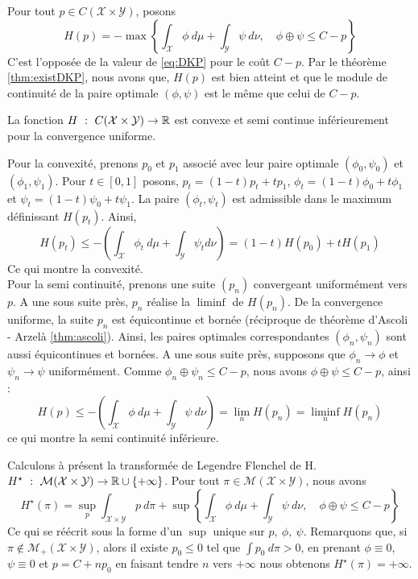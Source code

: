 \documentclass[a4paper,12pt]{article}
\begin{document}
\begin{preuve}
Pour tout $p\in C(\mathcal{X}\times\mathcal{Y})$, posons 
$$
H(p) = -\max\left\{\int_{\mathcal{X}} \phi\ d\mu +\int_{\mathcal{Y}} \psi\ d\nu, \quad \phi\oplus\psi\leq C-p\right\}
$$
C'est l'opposée de la valeur de \eqref{eq:DKP} pour le coût $C-p$. Par le théorème \ref{thm:existDKP}, nous avons que, $H(p)$ est bien atteint et que le module de continuité de la paire optimale $(\phi,\psi)$ est le même que celui de $C-p$. 
\begin{lemme}
La fonction $H\ :\ C(\mathcal{X}\times\mathcal{Y})\rightarrow\RR$ est convexe et semi continue inférieurement pour la convergence uniforme.
\end{lemme}
\begin{preuve}
Pour la convexité, prenons $p_0$ et $p_1$ associé avec leur paire optimale $(\phi_0,\psi_0)$ et $(\phi_1,\psi_1)$. Pour $t\in [0,1]$ posons, $p_t=(1-t)p_t+tp_1$, $\phi_t=(1-t)\phi_0 + t\phi_1$ et $\psi_t=(1-t)\psi_0+t\psi_1$. La paire $(\phi_t,\psi_t)$ est admissible dans le maximum définissant $H(p_t)$. Ainsi, 
$$
H(p_t)\leq-\left(\int_{\mathcal{X}}\phi_t\ d\mu+\int_{\mathcal{Y}}\psi_t d\nu\right) = (1-t)H(p_0)+tH(p_1)
$$
Ce qui montre la convexité.\\
Pour la semi continuité, prenons une suite $(p_n)$ convergeant uniformément vers $p$. A une sous suite près, $p_n$ réalise la $\liminf$ de $H(p_n)$. De la convergence uniforme, la suite $p_n$ est équicontinue et bornée (réciproque de théorème d'Ascoli - Arzelà \eqref{thm:ascoli}). Ainsi, les paires optimales correspondantes $(\phi_n,\psi_n)$ sont aussi équicontinues et bornées. A une sous suite près, supposons que $\phi_n\rightarrow\phi$ et $\psi_n\rightarrow\psi$ uniformément. Comme $\phi_n\oplus\psi_n\leq C-p$, nous avons $\phi\oplus\psi\leq C-p$, ainsi :
$$
H(p) \leq - \left(\int_{\mathcal{X}}\phi\ d\mu+\int_{\mathcal{Y}}\psi\ d\nu\right) = \lim_n H(p_n)=\liminf_n H(p_n)
$$
ce qui montre la semi continuité inférieure.
\end{preuve}
Calculons à présent la transformée de Legendre Flenchel de H.\\
$H^{\star}\ :\ \mathcal{M}(\mathcal{X}\times\mathcal{Y})\rightarrow\RR\cup\{+\infty\}$. Pour tout $\pi\in\mathcal{M}(\mathcal{X}\times\mathcal{Y})$, nous avons 
$$
H^{\star}(\pi)= \sup_p \int_{\mathcal{X}\times\mathcal{Y}} p\ d\pi + \sup \left\{ \int_{\mathcal{X}}\phi\ d\mu + \int_{\mathcal{Y}}\psi\ d\nu, \quad \phi\oplus\psi\leq C- p \right\}
$$
Ce qui se réécrit sous la forme d'un $\sup$ unique sur $p,\ \phi,\ \psi$. Remarquons que, si $\pi\notin\mathcal{M}_+(\mathcal{X}\times\mathcal{Y})$, alors il existe $p_0\leq 0$ tel que $\int p_0\ d\pi >0$, en prenant $\phi\equiv 0$, $\psi\equiv 0$ et $p=C+np_0$ en faisant tendre $n$ vers $+\infty$ nous obtenons $H^{\star}(\pi)=+\infty$.\\

\end{preuve}
\end{document}
